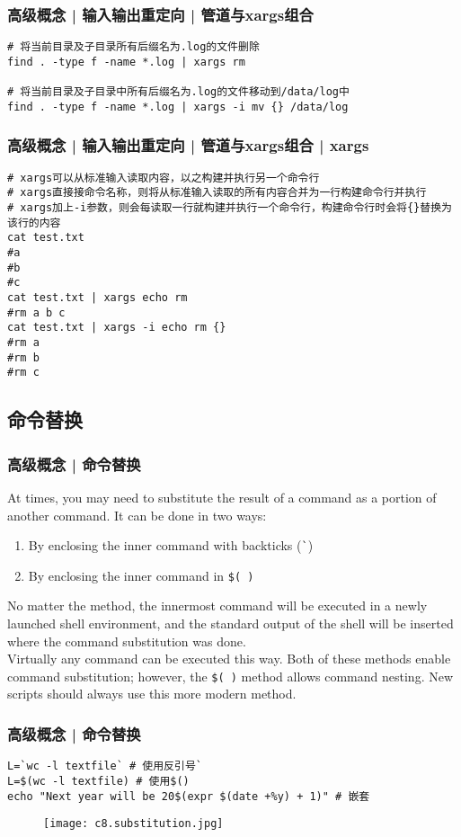 \begin{frame}[fragile]
  \frametitle{高级概念 | 输入输出重定向 | 管道与xargs组合}
\begin{lstlisting}
# 将当前目录及子目录所有后缀名为.log的文件删除
find . -type f -name *.log | xargs rm

# 将当前目录及子目录中所有后缀名为.log的文件移动到/data/log中
find . -type f -name *.log | xargs -i mv {} /data/log
\end{lstlisting}
\end{frame}

\begin{frame}[fragile]
  \frametitle{高级概念 | 输入输出重定向 | 管道与xargs组合 | xargs}
\begin{lstlisting}
# xargs可以从标准输入读取内容，以之构建并执行另一个命令行
# xargs直接接命令名称，则将从标准输入读取的所有内容合并为一行构建命令行并执行
# xargs加上-i参数，则会每读取一行就构建并执行一个命令行，构建命令行时会将{}替换为该行的内容
cat test.txt
#a
#b
#c
cat test.txt | xargs echo rm 
#rm a b c
cat test.txt | xargs -i echo rm {}
#rm a
#rm b
#rm c
\end{lstlisting}
\end{frame}

\subsection{命令替换}
\begin{frame}[fragile]
  \frametitle{高级概念 | 命令替换}
  At times, you may need to substitute the result of a command as a portion of another command. It can be done in two ways:
  \begin{enumerate}
    \item By enclosing the inner command with backticks (\verb|`|)
    \item By enclosing the inner command in \verb|$( )|
  \end{enumerate}
  No matter the method, the innermost command will be executed in a newly launched shell environment, and the standard output of the shell will be inserted where the command substitution was done.\\
  \vspace{0.3cm}
  Virtually any command can be executed this way. Both of these methods enable command substitution; however, the \verb|$( )| method allows command nesting. New scripts should always use this more modern method.
\end{frame}

\begin{frame}[fragile]
  \frametitle{高级概念 | \alert{命令替换}}
\begin{lstlisting}
L=`wc -l textfile` # 使用反引号`
L=$(wc -l textfile) # 使用$()
echo "Next year will be 20$(expr $(date +%y) + 1)" # 嵌套
\end{lstlisting}
  \begin{figure}
    \centering
    \texttt{[image: c8.substitution.jpg]}
  \end{figure}
\end{frame}

